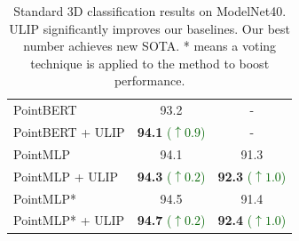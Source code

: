 \documentclass[10pt,twocolumn,letterpaper]{article}
\begin{document}
\begin{table}[htb]
\begin{tabular}{lcc}
         \midrule
         PointBERT  & 93.2 &  -\\
        PointBERT + ULIP & \textbf{94.1} \textcolor{DarkGreen}{\small ($\uparrow 0.9$)} & - \\
         \midrule
         PointMLP  & 94.1 & 91.3 \\
         PointMLP + ULIP  &  \textbf{94.3} \textcolor{DarkGreen}{\small ($\uparrow 0.2$)} & \textbf{92.3} \textcolor{DarkGreen}{\small ($\uparrow 1.0$)} \\
         \midrule
         PointMLP*  &  94.5 & 91.4 \\
        PointMLP* + ULIP  &  \textbf{94.7} \textcolor{DarkGreen}{\small ($\uparrow 0.2$)} & \textbf{92.4} \textcolor{DarkGreen}{\small ($\uparrow 1.0$)}\\
         \bottomrule
    \end{tabular}
    \caption{Standard 3D classification results on ModelNet40. ULIP significantly improves our baselines. Our best number achieves new SOTA. * means a voting technique is applied to the method to boost performance.}
    \label{tab:fintune-modelnet}
    \vspace{-4mm}
\end{table}
\end{document}
